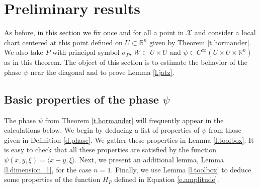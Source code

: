 \documentclass[10pt,twoside]{article}
\newcommand{\R}{\mathbb{R}}
\newcommand{\man}{\mathcal{X}}
\numberwithin{theorem}{section}
\begin{document}
\vfill
\pagebreak

\begin{figure}[omitted: a diagram of this paper's results, not reproduced here]\end{figure}

\pagebreak



\section{Preliminary results}\label{s.preliminaries}

As before, in this section we fix once and for all a point in $\man$ and consider a local chart centered at this point defined on $U\subset\R^n$ given by Theorem \ref{t.hormander}. We also take $P$ with principal symbol $\sigma_P$, $W\subset U\times U$ and $\psi\in C^\infty(U\times U\times\R^n)$ as in this theorem. The object of this section is to estimate the behavior of the phase $\psi$ near the diagonal and to prove Lemma \ref{l.jatz}.

\subsection{Basic properties of the phase $\psi$}\label{ss.psi}

The phase $\psi$ from Theorem \ref{t.hormander} will frequently appear in the calculations below. We begin by deducing a list of properties of $\psi$ from those given in Definition \ref{d.phase}. We gather these properties in Lemma \ref{l.toolbox}. It is easy to check that all these properties are satisfied by the function $\psi(x,y,\xi)=\langle x-y,\xi\rangle$. Next, we present an additional lemma, Lemma \ref{l.dimension_1}, for the case $n=1$. Finally, we use Lemma \ref{l.toolbox} to deduce some properties of the function $H_P$ defined in Equation \eqref{e.amplitude}.
\end{document}
